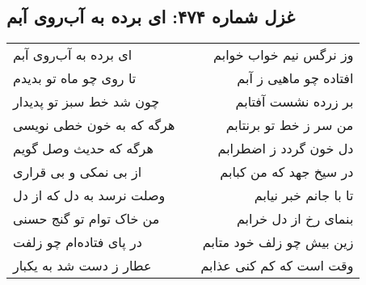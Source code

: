 \begin{center}
\section*{غزل شماره ۴۷۴: ای برده به آب‌روی آبم}
\label{sec:474}
\begin{longtable}{l p{0.5cm} r}
ای برده به آب‌روی آبم
&&
وز نرگس نیم خواب خوابم
\\
تا روی چو ماه تو بدیدم
&&
افتاده چو ماهیی ز آبم
\\
چون شد خط سبز تو پدیدار
&&
بر زرده نشست آفتابم
\\
هرگه که به خون خطی نویسی
&&
من سر ز خط تو برنتابم
\\
هرگه که حدیث وصل گویم
&&
دل خون گردد ز اضطرابم
\\
از بی نمکی و بی قراری
&&
در سیخ جهد که من کبابم
\\
وصلت نرسد به دل که از دل
&&
تا با جانم خبر نیابم
\\
من خاک توام تو گنج حسنی
&&
بنمای رخ از دل خرابم
\\
در پای فتاده‌ام چو زلفت
&&
زین بیش چو زلف خود متابم
\\
عطار ز دست شد به یکبار
&&
وقت است که کم کنی عذابم
\\
\end{longtable}
\end{center}
